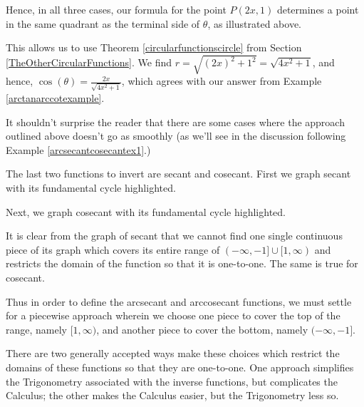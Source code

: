 \documentclass{ximera}
\begin{document}
 

Hence, in all three cases, our formula for the point $P(2x,1)$ determines a point in the same quadrant as the terminal side of $\theta$, as illustrated above.  

 

This allows us to use Theorem \ref{circularfunctionscircle} from Section \ref{TheOtherCircularFunctions}.  We find $r = \sqrt{(2x)^2+1^2} = \sqrt{4x^2+1}$, and hence,  $\cos(\theta) = \frac{2x}{\sqrt{4x^2+1}}$, which agrees with our answer from Example  \ref{arctanarccotexample}.

 

It shouldn't surprise the reader that there are some cases where the approach outlined above doesn't go as smoothly (as we'll see in the discussion following Example \ref{arcsecantcosecantex1}.)


 

The last two functions to invert are secant and cosecant.  First we graph secant with its fundamental cycle highlighted.

\begin{center}
\end{center}

Next, we graph cosecant with its fundamental cycle highlighted.

\begin{center}
\end{center}


It is clear from the graph of secant that we cannot find one single continuous piece of its graph which covers its entire range of $(-\infty, -1] \cup [1, \infty)$ and restricts the domain of the function so that it is one-to-one.  The same is true for cosecant.  

 

Thus in order to define the arcsecant and arccosecant functions, we must settle for a piecewise approach wherein we choose one piece to cover the top of the range, namely  $[1, \infty)$, and another piece to cover the bottom, namely $(-\infty, -1]$.  

 

There are two generally accepted ways make these choices which restrict the domains of these functions so that they are one-to-one.  One approach simplifies the Trigonometry associated with the inverse functions, but complicates the Calculus;  the other makes the Calculus easier, but the Trigonometry less so. 
\end{document}
